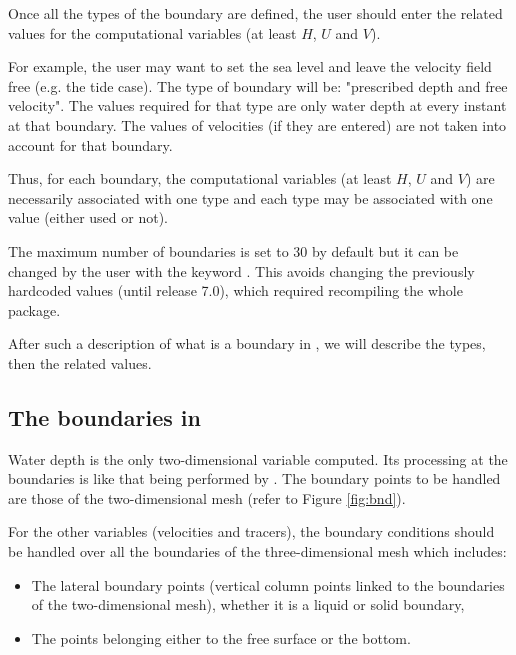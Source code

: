 Once all the types of the boundary are defined, the user should enter the
related values for the computational variables (at least $H$, $U$ and $V$).

For example, the user may want to set the sea level and leave the velocity
field free (e.g. the tide case). The type of boundary will be: "prescribed
depth and free velocity". The values required for that type are only water
depth at every instant at that boundary. The values of velocities (if they are
entered) are not taken into account for that boundary.

Thus, for each  boundary, the computational variables (at least
$H$, $U$ and $V$) are necessarily associated with one type
and each type may be associated with one value (either used or not).

The maximum number of boundaries is set to 30 by default but it can be changed
by the user with the keyword .
This avoids changing the previously hardcoded values (until release 7.0),
which required recompiling the whole package.

After such a description of what is a boundary in , we will describe
the types, then the related values.

\subsection{The boundaries in }

Water depth is the only two-dimensional variable computed. Its processing at
the boundaries is like that being performed by . The boundary points
to be handled are those of the two-dimensional mesh (refer to Figure
\ref{fig:bnd}).

For the other variables (velocities and tracers), the boundary conditions
should be handled over all the boundaries of the three-dimensional mesh which
includes:

\begin{itemize}
\item The lateral boundary points (vertical column points linked to the
boundaries of the two-dimensional mesh), whether it is a liquid or solid
boundary,

\item The points belonging either to the free surface or the bottom.
\end{itemize}

